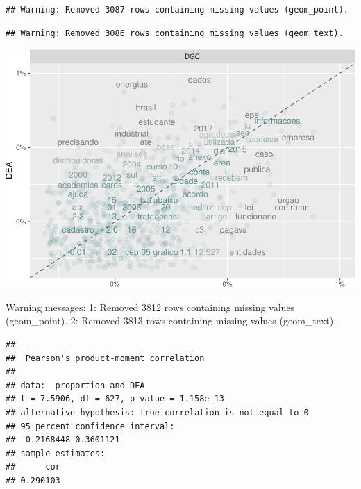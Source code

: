 \documentclass[]{article}
\newenvironment{Shaded}{\begin{snugshade}}{\end{snugshade}}
\newcommand{\KeywordTok}[1]{\textcolor[rgb]{0.13,0.29,0.53}{\textbf{#1}}}
\newcommand{\DataTypeTok}[1]{\textcolor[rgb]{0.13,0.29,0.53}{#1}}
\newcommand{\StringTok}[1]{\textcolor[rgb]{0.31,0.60,0.02}{#1}}
\newcommand{\FunctionTok}[1]{\textcolor[rgb]{0.00,0.00,0.00}{#1}}
\newcommand{\OperatorTok}[1]{\textcolor[rgb]{0.81,0.36,0.00}{\textbf{#1}}}
\newcommand{\AttributeTok}[1]{\textcolor[rgb]{0.77,0.63,0.00}{#1}}
\newcommand{\NormalTok}[1]{#1}
\begin{document}
\begin{verbatim}
## Warning: Removed 3087 rows containing missing values (geom_point).
\end{verbatim}

\begin{verbatim}
## Warning: Removed 3086 rows containing missing values (geom_text).
\end{verbatim}

\includegraphics{markdown_v31_files/figure-latex/unnamed-chunk-63-1.pdf}

\begin{Shaded}
\begin{Highlighting}[]
\FunctionTok{Warning messages:}
\FunctionTok{1:}\AttributeTok{ Removed 3812 rows containing missing values (geom_point). }
\FunctionTok{2:}\AttributeTok{ Removed 3813 rows containing missing values (geom_text).}
\end{Highlighting}
\end{Shaded}

\begin{Shaded}
\end{Shaded}

\begin{verbatim}
## 
##  Pearson's product-moment correlation
## 
## data:  proportion and DEA
## t = 7.5906, df = 627, p-value = 1.158e-13
## alternative hypothesis: true correlation is not equal to 0
## 95 percent confidence interval:
##  0.2168448 0.3601121
## sample estimates:
##      cor 
## 0.290103
\end{verbatim}
\end{document}

